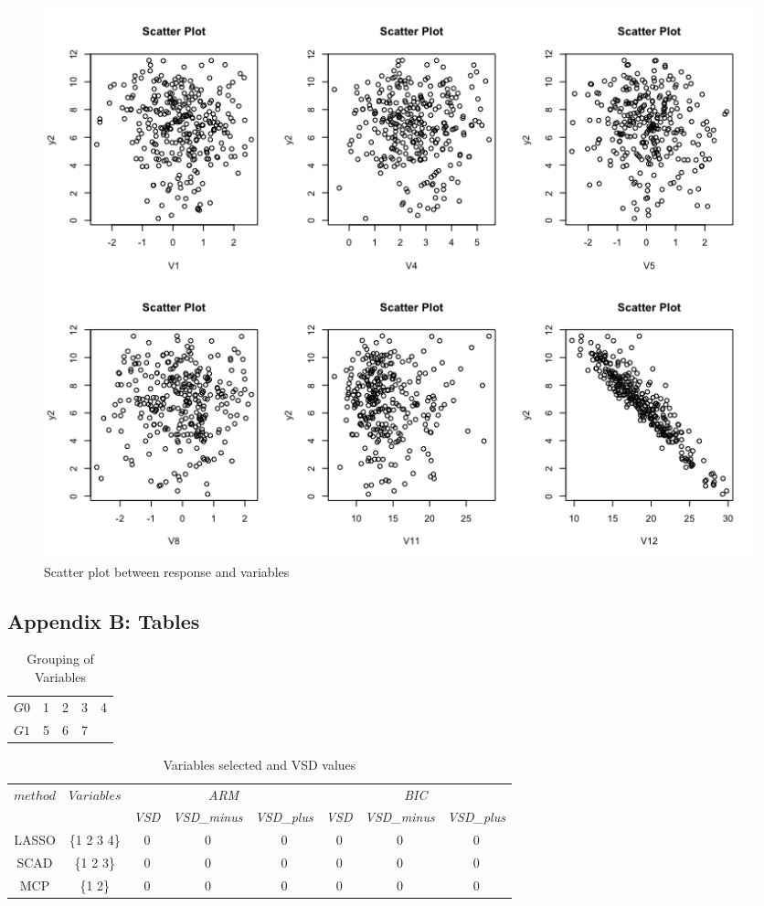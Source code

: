 \documentclass[11pt a4paper]{article}
\begin{document}
\begin{figure}[H]
	\centering
	\includegraphics[scale=0.45]{scatter1.png}
	\caption{Scatter plot between response and variables}
	\label{fig:scatter1}
\end{figure}




\subsection*{Appendix B: Tables}

\begin{table}[H]
	\centering
	\caption{Grouping of Variables}
	\begin{tabular}{c|cccc}
		\hline
		$G0$ & 1 & 2 & 3 & 4  \\
		$G1$ & 5 & 6 & 7 &   \\
		\hline
	\end{tabular}
	\label{table:var-group}
\end{table}

\begin{table}[H]
	\centering
	\caption{Variables selected and VSD values}
	\begin{tabular}{c|ccccccc}
		\hline
		\multirow{2}{*}{$method$} & \multirow{2}{*}{$Variables$} & \multicolumn{3}{c}{\textsl{ARM}} & \multicolumn{3}{c}{\textsl{BIC}} \\
		\cline{3-8}
		&  & \textsl{VSD} & \textsl{VSD\_minus} & \textsl{VSD\_plus} & \textsl{VSD} & \textsl{VSD\_minus} & \textsl{VSD\_plus} \\
		\hline
		LASSO & \{1 2 3 4\} & 0 & 0 & 0  & 0 & 0 & 0  \\
		SCAD & \{1 2 3\} & 0 & 0 & 0  & 0 & 0 & 0 \\
		MCP & \{1 2\} & 0 & 0 & 0  & 0 & 0 & 0 \\
		\hline
	\end{tabular}
	\label{table:vsd}
\end{table}
\end{document}
